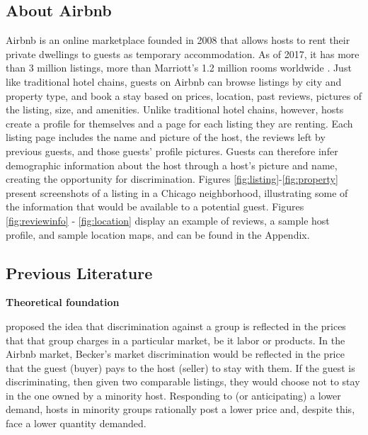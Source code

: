 \subsection{About Airbnb} 
\label{about}
Airbnb is an online marketplace founded in 2008 that allows hosts to rent their private dwellings to guests as temporary accommodation. As of 2017, it has more than 3 million listings, more than Marriott's 1.2 million rooms worldwide \citep{aboutus}. Just like traditional hotel chains, guests on Airbnb can browse listings by city and property type, and book a stay based on prices, location, past reviews, pictures of the listing, size, and amenities. Unlike traditional hotel chains, however, hosts create a profile for themselves and a page for each listing they are renting. Each listing page includes the name and picture of the host, the reviews left by previous guests, and those guests' profile pictures. Guests can therefore infer demographic information about the host through a host's picture and name, creating the opportunity for discrimination. Figures \ref{fig:listing}-\ref{fig:property} present screenshots of a listing in a Chicago neighborhood, illustrating some of the information that would be available to a potential guest. Figures \ref{fig:reviewinfo} - \ref{fig:location} display an example of reviews, a sample host profile, and sample location maps, and can be found in the Appendix.










\subsection{Previous Literature} 
\label{previous}

\textbf{Theoretical foundation}

\cite{becker} proposed the idea that discrimination against a group is reflected in the prices that that group charges in a particular market, be it labor or products. In the Airbnb market, Becker's market discrimination would be reflected in the price that the guest (buyer) pays to the host (seller) to stay with them. If the guest is discriminating, then given two comparable listings, they would choose not to stay in the one owned by a minority host. Responding to (or anticipating) a lower demand, hosts in minority groups rationally post a lower price and, despite this, face a lower quantity demanded. 


